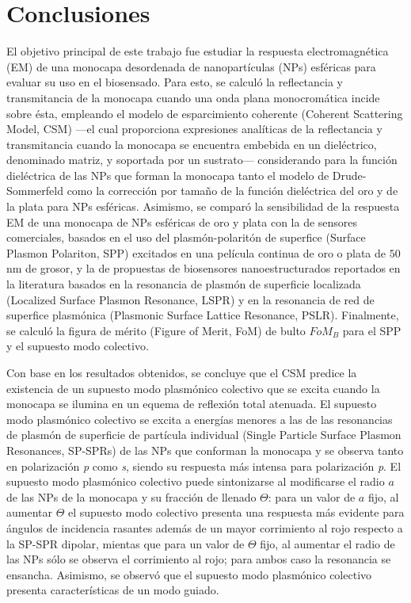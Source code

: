\chapter*{Conclusiones}
\label{chapter:Conclusiones}

El objetivo principal de este trabajo fue estudiar la respuesta electromagnética (EM) de una monocapa desordenada de nanopartículas (NPs) esféricas para evaluar su uso en el biosensado. Para esto, se calculó la  reflectancia y transmitancia de la monocapa cuando una onda plana monocromática incide sobre ésta, empleando el modelo de esparcimiento coherente (Coherent Scattering Model, CSM) \cite{reyes2018analytical,pena-gomar2006coherent,barrera1991optical,garcia2012multiple} ---el cual proporciona expresiones analíticas de la reflectancia y transmitancia cuando la monocapa se encuentra embebida en un dieléctrico, denominado matriz, y soportada por un sustrato--- considerando para  la función dieléctrica de las NPs que forman la monocapa tanto el modelo de Drude-Sommerfeld como  la corrección por tamaño de la función dieléctrica del oro y de la plata para NPs esféricas. Asimismo, se comparó la sensibilidad de la respuesta EM de una monocapa de NPs esféricas de oro y plata con la de sensores comerciales, basados en el uso del plasmón-polaritón de superfice (Surface Plasmon Polariton, SPP)  excitados en una película continua de oro o plata de $50$ nm de grosor, y la de propuestas de biosensores nanoestructurados reportados en la literatura \cite{svedendahl2009refractometric,kabashin2009plasmonic,danilov2018ultra} basados en la resonancia de plasmón de superficie localizada (Localized Surface Plasmon Resonance, LSPR) y en la resonancia de red de superfice plasmónica (Plasmonic Surface Lattice Resonance, PSLR). Finalmente, se calculó la figura de mérito (Figure of Merit, FoM) de bulto $\textit{FoM}_B$ para el SPP y el supuesto modo colectivo.

Con base en los resultados obtenidos, se concluye que el  CSM predice la existencia de un supuesto modo plasmónico colectivo que se excita cuando la monocapa se ilumina en un equema de reflexión total atenuada. El supuesto modo plasmónico colectivo se excita a energías menores a las de las resonancias de plasmón de superficie de partícula individual (Single Particle Surface Plasmon Resonances, SP-SPRs) de las NPs que conforman la monocapa y se observa tanto en polarización \emph{p} como \emph{s}, siendo su respuesta más intensa para polarización \emph{p}. El supuesto modo plasmónico colectivo puede sintonizarse al modificarse el radio $a$ de las NPs de la monocapa y su fracción de llenado $\Theta$: para un valor de $a$ fijo, al aumentar $\Theta$ el supuesto modo colectivo presenta una respuesta más evidente para ángulos de incidencia rasantes además de un mayor corrimiento al rojo respecto a la SP-SPR dipolar, mientas que para un valor de $\Theta$ fijo, al aumentar el radio de las NPs sólo se observa el corrimiento al rojo; para ambos caso la resonancia se ensancha. Asimismo, se observó que el supuesto modo plasmónico colectivo presenta características de un modo guiado.

